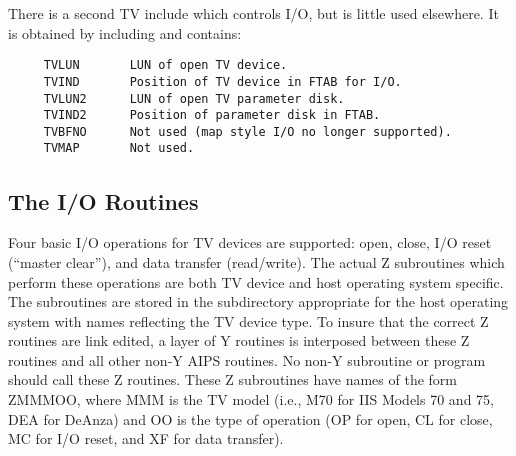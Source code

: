 There is a second TV include which controls I/O, but is little used
elsewhere.  It is obtained by including  and contains:
\begin{verbatim}
     TVLUN       LUN of open TV device.
     TVIND       Position of TV device in FTAB for I/O.
     TVLUN2      LUN of open TV parameter disk.
     TVIND2      Position of parameter disk in FTAB.
     TVBFNO      Not used (map style I/O no longer supported).
     TVMAP       Not used.
\end{verbatim}

\subsection{The I/O Routines}
Four basic I/O operations for TV devices are supported: open, close,
I/O reset (``master clear''), and data transfer (read/write). The actual
Z subroutines which perform these operations are both TV device and
host operating system specific.  The subroutines are stored in the
subdirectory appropriate for the host operating system with names
reflecting the TV device type.  To insure that the correct Z routines
are link edited, a layer of Y routines is interposed between these Z
routines and all other non-Y AIPS routines.  No non-Y subroutine or
program should call these Z routines.  These Z subroutines have names
of the form ZMMMOO, where MMM is the TV model (i.e., M70 for IIS
Models 70 and 75, DEA for DeAnza) and OO is the type of operation (OP
for open, CL for close, MC for I/O reset, and XF for data transfer).

